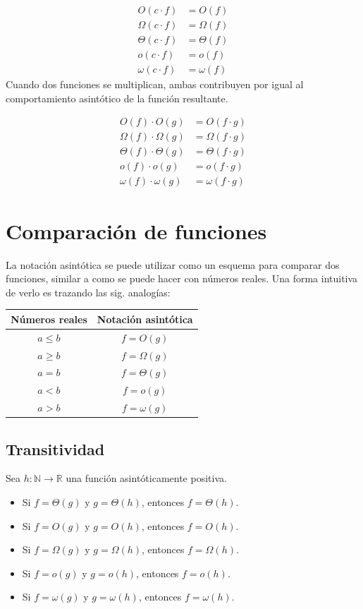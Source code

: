 \[
\begin{aligned}O(c\cdot f) & =O(f)\\
\Omega(c\cdot f) & =\Omega(f)\\
\Theta(c\cdot f) & =\Theta(f)\\
o(c\cdot f) & =o(f)\\
\omega(c\cdot f) & =\omega(f)
\end{aligned}
\]
Cuando dos funciones se multiplican, ambas contribuyen por igual al
comportamiento asintótico de la función resultante.

\[
\begin{aligned}O(f)\cdot O(g) & =O(f\cdot g)\\
\Omega(f)\cdot\Omega(g) & =\Omega(f\cdot g)\\
\Theta(f)\cdot\Theta(g) & =\Theta(f\cdot g)\\
o(f)\cdot o(g) & =o(f\cdot g)\\
\omega(f)\cdot\omega(g) & =\omega(f\cdot g)
\end{aligned}
\]


\section{Comparación de funciones}

La notación asintótica se puede utilizar como un esquema para comparar
dos funciones, similar a como se puede hacer con números reales. Una
forma intuitiva de verlo es trazando las sig. analogías:
\begin{center}
\begin{tabular}{cc}
\toprule 
Números reales & Notación asintótica\tabularnewline
\midrule
$a\leq b$ & $f=O(g)$\tabularnewline
$a\ge b$ & $f=\Omega(g)$\tabularnewline
$a=b$ & $f=\Theta(g)$\tabularnewline
$a<b$ & $f=o(g)$\tabularnewline
$a>b$ & $f=\omega(g)$\tabularnewline
\bottomrule
\end{tabular}
\par\end{center}

\subsection{Transitividad}

Sea $h:\mathbb{N}\to\mathbb{R}$ una función asintóticamente positiva. 
\begin{itemize}
\item Si $f=\Theta(g)$ y $g=\Theta(h)$, entonces $f=\Theta(h)$.
\item Si $f=O(g)$ y $g=O(h)$, entonces $f=O(h)$. 
\item Si $f=\Omega(g)$ y $g=\Omega(h)$, entonces $f=\Omega(h)$.
\item Si $f=o(g)$ y $g=o(h)$, entonces $f=o(h)$.
\item Si $f=\omega(g)$ y $g=\omega(h)$, entonces $f=\omega(h)$.
\end{itemize}

